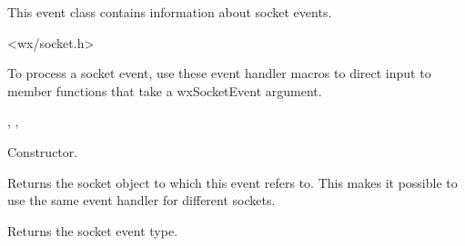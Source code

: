 This event class contains information about socket events.




<wx/socket.h>


To process a socket event, use these event handler macros to direct input to member
functions that take a wxSocketEvent argument.

\twocolwidtha{7cm}
\begin{twocollist}\itemsep=0pt
\end{twocollist}


, 
, 




Constructor.

\label{wxsocketeventsocket}


Returns the socket object to which this event refers to. This makes
it possible to use the same event handler for different sockets.

\label{wxsocketeventsocketevent}


Returns the socket event type.

\section{}\label{wxsocketserver}



